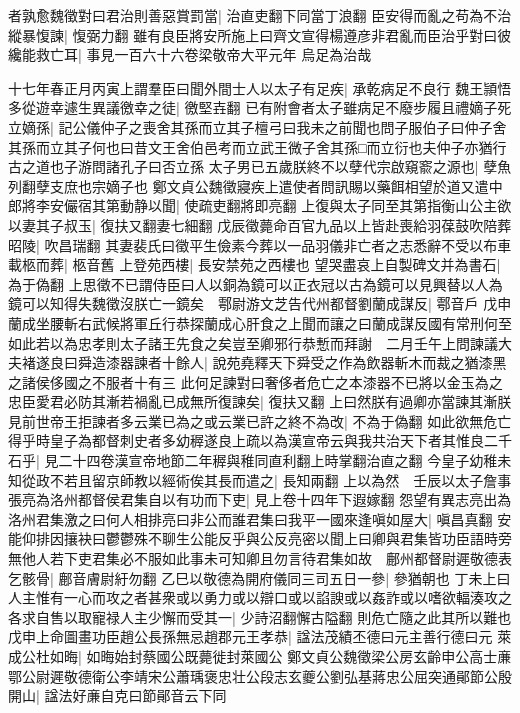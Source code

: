 者孰愈魏徵對曰君治則善惡賞罰當|{
	治直吏翻下同當丁浪翻}
臣安得而亂之苟為不治縱暴愎諫|{
	愎弼力翻}
雖有良臣將安所施上曰齊文宣得楊遵彦非君亂而臣治乎對曰彼纔能救亡耳|{
	事見一百六十六卷梁敬帝大平元年}
烏足為治哉

十七年春正月丙寅上謂羣臣曰聞外間士人以太子有足疾|{
	承乾病足不良行}
魏王頴悟多從遊幸遽生異議徼幸之徒|{
	徼堅壵翻}
已有附會者太子雖病足不廢步履且禮嫡子死立嫡孫|{
	記公儀仲子之喪舍其孫而立其子檀弓曰我未之前聞也問子服伯子曰仲子舍其孫而立其子何也曰昔文王舍伯邑考而立武王微子舍其孫□而立衍也夫仲子亦猶行古之道也子游問諸孔子曰否立孫}
太子男已五歲朕終不以孽代宗啟窺窬之源也|{
	孽魚列翻孽支庶也宗嫡子也}
鄭文貞公魏徵寢疾上遣使者問訊賜以藥餌相望於道又遣中郎將李安儼宿其第動静以聞|{
	使疏吏翻將即亮翻}
上復與太子同至其第指衡山公主欲以妻其子叔玉|{
	復扶又翻妻七細翻}
戊辰徵薨命百官九品以上皆赴喪給羽葆鼓吹陪葬昭陵|{
	吹昌瑞翻}
其妻裴氏曰徵平生儉素今葬以一品羽儀非亡者之志悉辭不受以布車載柩而葬|{
	柩音舊}
上登苑西樓|{
	長安禁苑之西樓也}
望哭盡哀上自製碑文并為書石|{
	為于偽翻}
上思徵不已謂侍臣曰人以銅為鏡可以正衣冠以古為鏡可以見興替以人為鏡可以知得失魏徵沒朕亡一鏡矣　鄠尉游文芝告代州都督劉蘭成謀反|{
	鄠音戶}
戊申蘭成坐腰斬右武候將軍丘行恭探蘭成心肝食之上聞而讓之曰蘭成謀反國有常刑何至如此若以為忠孝則太子諸王先食之矣豈至卿邪行恭慙而拜謝　二月壬午上問諫議大夫褚遂良曰舜造漆器諫者十餘人|{
	說苑堯釋天下舜受之作為飲器斬木而裁之猶漆黑之諸侯侈國之不服者十有三}
此何足諫對曰奢侈者危亡之本漆器不已將以金玉為之忠臣愛君必防其漸若禍亂已成無所復諫矣|{
	復扶又翻}
上曰然朕有過卿亦當諫其漸朕見前世帝王拒諫者多云業已為之或云業已許之終不為改|{
	不為于偽翻}
如此欲無危亡得乎時皇子為都督刺史者多幼稺遂良上疏以為漢宣帝云與我共治天下者其惟良二千石乎|{
	見二十四卷漢宣帝地節二年稺與稚同直利翻上時掌翻治直之翻}
今皇子幼稚未知從政不若且留京師教以經術俟其長而遣之|{
	長知兩翻}
上以為然　壬辰以太子詹事張亮為洛州都督侯君集自以有功而下吏|{
	見上卷十四年下遐嫁翻}
怨望有異志亮出為洛州君集激之曰何人相排亮曰非公而誰君集曰我平一國來逢嗔如屋大|{
	嗔昌真翻}
安能仰排因攘袂曰鬱鬱殊不聊生公能反乎與公反亮密以聞上曰卿與君集皆功臣語時旁無他人若下吏君集必不服如此事未可知卿且勿言待君集如故　鄜州都督尉遲敬德表乞骸骨|{
	鄜音膚尉紆勿翻}
乙巳以敬德為開府儀同三司五日一參|{
	參猶朝也}
丁未上曰人主惟有一心而攻之者甚衆或以勇力或以辯口或以諂諛或以姦詐或以嗜欲輻湊攻之各求自售以取寵禄人主少懈而受其一|{
	少詩沼翻懈古隘翻}
則危亡隨之此其所以難也　戊申上命圖畫功臣趙公長孫無忌趙郡元王孝恭|{
	諡法茂績丕德曰元主善行德曰元}
萊成公杜如晦|{
	如晦始封蔡國公既薨徙封萊國公}
鄭文貞公魏徵梁公房玄齡申公高士亷鄂公尉遲敬德衛公李靖宋公蕭瑀褒忠壮公段志玄夔公劉弘基蔣忠公屈突通鄖節公殷開山|{
	諡法好亷自克曰節鄖音云下同}
